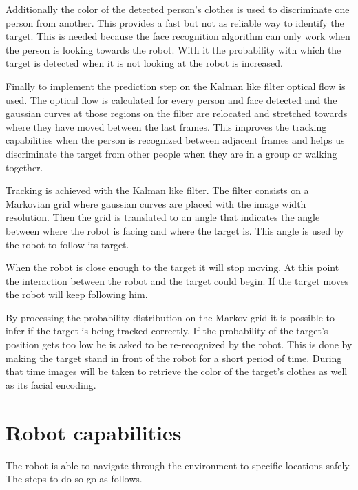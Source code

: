 Additionally the color of the detected person's clothes is used to discriminate one person from another.
This provides a fast but not as reliable way to identify the target.
This is needed because the face recognition algorithm can only work when the person is looking towards the robot.
With it the probability with which the target is detected when it is not looking at the robot is increased.

Finally to implement the prediction step on the Kalman like filter optical flow is used.
The optical flow is calculated for every person and face detected and the gaussian curves at those regions on the filter are relocated and stretched towards where they have moved between the last frames.
This improves the tracking capabilities when the person is recognized between adjacent frames and helps us discriminate the target from other people when they are in a group or walking together.

Tracking is achieved with the Kalman like filter.
The filter consists on a Markovian grid where gaussian curves are placed with the image width resolution.
Then the grid is translated to an angle that indicates the angle between where the robot is facing and where the target is.
This angle is used by the robot to follow its target.

When the robot is close enough to the target it will stop moving.
At this point the interaction between the robot and the target could begin.
If the target moves the robot will keep following him.

By processing the probability distribution on the Markov grid it is possible to infer if the target is being tracked correctly.
If the probability of the target's position gets too low he is asked to be re-recognized by the robot.
This is done by making the target stand in front of the robot for a short period of time.
During that time images will be taken to retrieve the color of the target's clothes as well as its facial encoding. 

\section{Robot capabilities}
The robot is able to navigate through the environment to specific locations safely.
The steps to do so go as follows.


